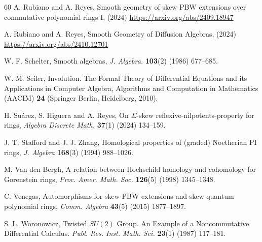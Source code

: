 \documentclass{amsart}
\theoremstyle{definition}
\theoremstyle{remark}
\numberwithin{equation}{section}
\begin{document}
\begin{thebibliography}{60}
 A. Rubiano and  A. Reyes, Smooth geometry of skew PBW extensions over commutative polynomial rings I, (2024) \url{https://arxiv.org/abs/2409.18947}

 A. Rubiano and  A. Reyes, Smooth Geometry of Diffusion Algebras, (2024) \url{https://arxiv.org/abs/2410.12701}

 W. F. Schelter, Smooth algebras, {\em J. Algebra.} {\bf 103}(2) (1986) 677--685.

 W. M. Seiler, Involution. {T}he {F}ormal {T}heory of {D}ifferential {E}quations and its {A}pplications in {C}omputer {A}lgebra, Algorithms and Computation in Mathematics (AACIM) {\bf 24} (Springer Berlin, Heidelberg, 2010).

 H. Su\'arez, S. Higuera and A. Reyes, On $\Sigma$-skew reflexive-nilpotents-property for rings, {\em Algebra Discrete Math.} {\bf 37}(1) (2024) 134--159.

 J. T. Stafford and J. J. Zhang, Homological properties of (graded) Noetherian PI rings, {\em J. Algebra} {\bf 168}(3) (1994) 988--1026.

 M. Van den Bergh, A relation between Hochschild homology and cohomology for Gorenstein rings, {\em Proc. Amer. Math. Soc.} {\bf 126}(5) (1998) 1345--1348.

 C. Venegas, Automorphisms for skew PBW extensions and skew quantum polynomial rings, {\em Comm. Algebra} {\bf 43}(5) (2015) 1877--1897.

 S. L. Woronowicz, Twisted $SU(2)$ {G}roup. An {E}xample of a {N}oncommutative {D}ifferential {C}alculus. {\em Publ. Res. Inst. Math. Sci.} {\bf 23}(1) (1987) 117--181.

\end{thebibliography}
\end{document}
